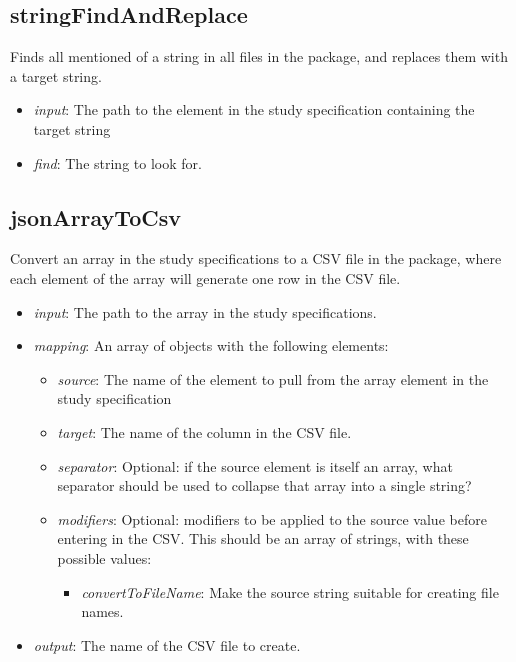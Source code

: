 \documentclass[]{article}
\providecommand{\tightlist}{%
  \setlength{\itemsep}{0pt}\setlength{\parskip}{0pt}}
\begin{document}
\hypertarget{stringfindandreplace}{%
\subsection{stringFindAndReplace}\label{stringfindandreplace}}

Finds all mentioned of a string in all files in the package, and
replaces them with a target string.

\begin{itemize}
\tightlist
\item
  \emph{input}: The path to the element in the study specification
  containing the target string
\item
  \emph{find}: The string to look for.
\end{itemize}

\hypertarget{jsonarraytocsv}{%
\subsection{jsonArrayToCsv}\label{jsonarraytocsv}}

Convert an array in the study specifications to a CSV file in the
package, where each element of the array will generate one row in the
CSV file.

\begin{itemize}
\tightlist
\item
  \emph{input}: The path to the array in the study specifications.
\item
  \emph{mapping}: An array of objects with the following elements:

  \begin{itemize}
  \tightlist
  \item
    \emph{source}: The name of the element to pull from the array
    element in the study specification
  \item
    \emph{target}: The name of the column in the CSV file.
  \item
    \emph{separator}: Optional: if the source element is itself an
    array, what separator should be used to collapse that array into a
    single string?
  \item
    \emph{modifiers}: Optional: modifiers to be applied to the source
    value before entering in the CSV. This should be an array of
    strings, with these possible values:

    \begin{itemize}
    \tightlist
    \item
      \emph{convertToFileName}: Make the source string suitable for
      creating file names.
    \end{itemize}
  \end{itemize}
\item
  \emph{output}: The name of the CSV file to create.
\end{itemize}
\end{document}
